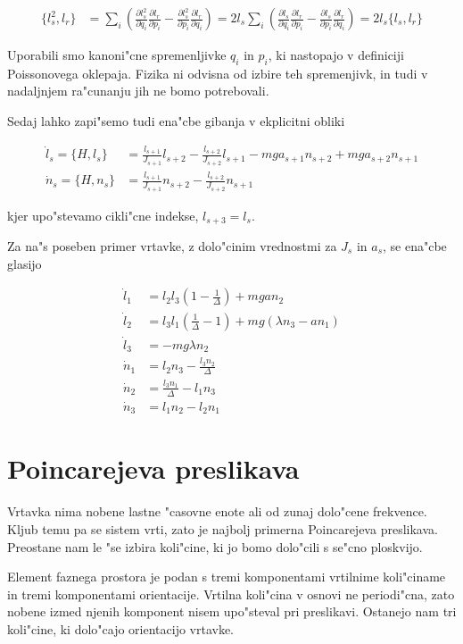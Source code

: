 \documentclass[a4paper,10pt]{article}
\newcommand{\parcialno}[2]{
  \frac{\partial #1}{\partial #2}
}
\begin{document}
\begin{align}
  \{l_s^2, l_r\} &= \sum_i\left( \parcialno{l_s^2}{q_i}\parcialno{l_r}{p_i} - \parcialno{l_s^2}{p_i}\parcialno{l_r}{q_i} \right) = 2l_s \sum_i\left( \parcialno{l_s}{q_i}\parcialno{l_r}{p_i} - \parcialno{l_s}{p_i}\parcialno{l_r}{q_i} \right) = 2l_s \{l_s, l_r\}
\end{align}

Uporabili smo kanoni"cne spremenljivke $q_i$ in $p_i$, ki nastopajo v definiciji Poissonovega oklepaja. Fizika ni odvisna od izbire teh spremenjivk, in tudi v nadaljnjem ra"cunanju jih ne bomo potrebovali. 

Sedaj lahko zapi"semo tudi ena"cbe gibanja v ekplicitni obliki

\begin{align}
  \dot l_s = \{H,l_s\} &= \frac{l_{s+1}}{J_{s+1}}l_{s+2} - \frac{l_{s+2}}{J_{s+2}}l_{s+1} - mga_{s+1}n_{s+2} + mga_{s+2}n_{s+1} \\
  \dot n_s = \{H,n_s\} &= \frac{l_{s+1}}{J_{s+1}}n_{s+2} - \frac{l_{s+2}}{J_{s+2}}n_{s+1}
\end{align}

kjer upo"stevamo cikli"cne indekse, $l_{s+3} = l_s$. 

Za na"s poseben primer vrtavke, z dolo"cinim vrednostmi za $J_s$ in $a_s$, se ena"cbe glasijo

\begin{align}
  \dot l_1 &= l_2l_3 \left( 1 - \frac{1}{\Delta} \right) + mgan_2 \\
  \dot l_2 &= l_3l_1 \left( \frac{1}{\Delta} - 1 \right) + mg\left( \lambda n_3 - a n_1 \right) \\
  \dot l_3 &= -mg \lambda n_2 \\
  \dot n_1 &= l_2n_3 - \frac{l_3n_2}{\Delta} \\
  \dot n_2 &= \frac{l_3n_1}{\Delta} - l_1n_3 \\
  \dot n_3 &= l_1 n_2 - l_2 n_1
\end{align}

\section{Poincarejeva preslikava}

Vrtavka nima nobene lastne "casovne enote ali od zunaj dolo"cene frekvence. Kljub temu pa se sistem vrti, zato je najbolj primerna Poincarejeva preslikava. Preostane nam le "se izbira koli"cine, ki jo bomo dolo"cili s se"cno ploskvijo. 

Element faznega prostora je podan s tremi komponentami vrtilnime koli"ciname in tremi komponentami orientacije. Vrtilna koli"cina v osnovi ne periodi"cna, zato nobene izmed njenih komponent nisem upo"steval pri preslikavi. Ostanejo nam tri koli"cine, ki dolo"cajo orientacijo vrtavke. 
\end{document}
